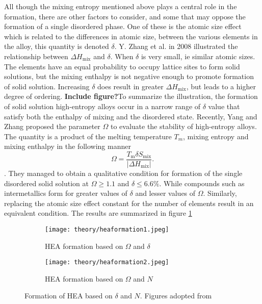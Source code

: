 All though the mixing entropy mentioned above plays a central role in the formation, there are other factors to consider, and some that may oppose the formation of a single disordered phase. One of these is the atomic size effect which is related to the differences in atomic size, between the various elements in the alloy, this quantity is denoted $\delta$. Y. Zhang et al. in 2008 illustrated the relationship between $\Delta H_\text{mix}$ and $\delta$. When $\delta$ is very small, ie similar atomic sizes. The elements have an equal probability to occupy lattice sites to form solid solutions, but the mixing enthalpy is not negative enough to promote formation of solid solution. Increasing $\delta$ does result in greater $\Delta H_\text{mix}$, but leads to a higher degree of ordering. \textbf{Include figure?}To summarize the illustration, the formation of solid solution high-entropy alloys occur in a narrow range of $\delta$ value that satisfy both the enthalpy of mixing and the disordered state. Recently, Yang and Zhang proposed the parameter $\Omega$ to evaluate the stability of high-entropy alloys. The quantity is a product of the melting temperature $T_m$, mixing entropy and mixing enthalpy in the following manner
\begin{equation}
\Omega = \frac{T_\text{m} \delta S_\text{mix}}{|\Delta H_\text{mix}|}.
\end{equation}
. They managed to obtain a qualitative condition for formation of the single disordered solid solution at $\Omega \geq 1.1$ and $\delta \leq 6.6\%$. While compounds such as intermetallics form for greater values of $\delta$ and lesser values of $\Omega$. Similarly, replacing the atomic size effect constant for the number of elements result in an equivalent condition. The results are summarized in figure \ref{Omega}

\begin{figure} 
\centering
\begin{subfigure}{0.7\textwidth}
\texttt{[image: theory/heaformation1.jpeg]}
\caption{HEA formation based on $\Omega$ and $\delta$}
\end{subfigure}
\begin{subfigure}{0.7\textwidth}
\texttt{[image: theory/heaformation2.jpeg]}
\caption{HEA formation based on $\Omega$ and $N$}
\end{subfigure}
\caption{Formation of HEA based on $\delta$ and $N$. Figures adopted from \cite{HEA2016}}
\label{Omega} 
\end{figure} 

